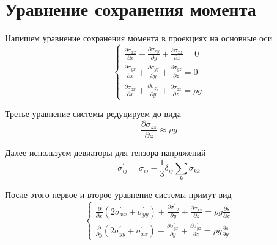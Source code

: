 \section*{Уравнение сохранения момента}

Напишем уравнение сохранения момента в проекциях на
основные оси
\begin{equation*}
    \begin{cases}
        \frac
            {\partial \sigma_{xx}}
            {\partial x}
        +
        \frac
            {\partial \sigma_{xy}}
            {\partial y}
        +
        \frac
            {\partial \sigma_{xz}}
            {\partial z}
        =
        0
        \\
        \frac
            {\partial \sigma_{yx}}
            {\partial x}
        +
        \frac
            {\partial \sigma_{yy}}
            {\partial y}
        +
        \frac
            {\partial \sigma_{yz}}
            {\partial z}
        =
        0
        \\
        \frac
            {\partial \sigma_{zx}}
            {\partial x}
        +
        \frac
            {\partial \sigma_{zy}}
            {\partial y}
        +
        \frac
            {\partial \sigma_{zz}}
            {\partial z}
        =
        \rho
        g
    \end{cases}
\end{equation*}

Третье уравнение системы редуцируем до вида
\begin{equation*}
    \frac
        {\partial \sigma_{zz}}
        {\partial z}
    \approx
    \rho
    g
\end{equation*}

Далее используем девиаторы для тензора напряжений
\begin{equation*}
    \sigma^{'}_{ij}
    =
    \sigma_{ij}
    -
    \frac
        {1}
        {3}
    \delta_{ij}
    \sum_{k}^{}
    \sigma_{kk}
\end{equation*}

После этого первое и второе уравнение системы примут
вид
\begin{equation*}
    \begin{cases}
        \frac
            {\partial}
            {\partial x}
        \left(
            2
            \sigma^{'}_{xx}
            +
            \sigma^{'}_{yy}
        \right)
        +
        \frac
            {\partial \sigma^{'}_{xy}}
            {\partial y}
        +
        \frac
            {\partial \sigma^{'}_{xz}}
            {\partial z}
        =
        \rho
        g
        \frac
            {\partial s}
            {\partial x}
        \\
        \frac
            {\partial}
            {\partial y}
        \left(
            2
            \sigma^{'}_{yy}
            +
            \sigma^{'}_{xx}
        \right)
        +
        \frac
            {\partial \sigma^{'}_{yx}}
            {\partial y}
        +
        \frac
            {\partial \sigma^{'}_{yz}}
            {\partial z}
        =
        \rho
        g
        \frac
            {\partial s}
            {\partial y}
    \end{cases}
\end{equation*}

